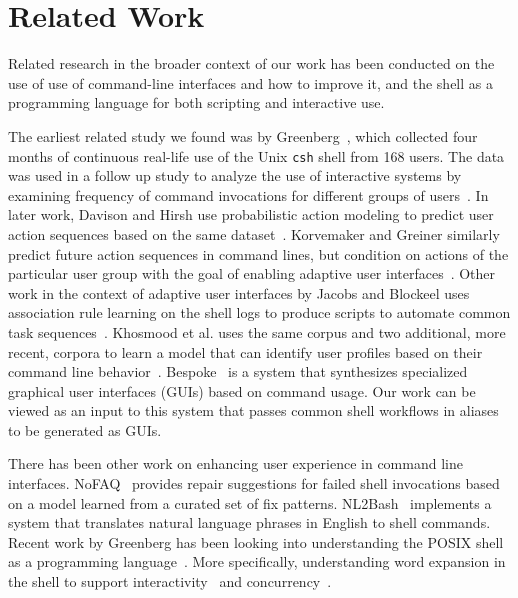 \section{Related Work}

Related research in the broader context of our work has been conducted on the use of use of command-line interfaces and how to improve it, and the shell as a programming language for both scripting and interactive use. 

The earliest related study we found was by Greenberg~\cite{greenberg:88a}, which collected four months of continuous real-life use of the Unix \verb|csh| shell from 168 users. 
The data was used in a follow up study to analyze the use of interactive systems by examining frequency of command invocations for different groups of users~\cite{greenberg:88b}.
In later work, Davison and Hirsh use probabilistic action modeling to predict user action sequences based on the same dataset~\cite{davison:98}.
Korvemaker and Greiner similarly predict future action sequences in command lines, but condition on actions of the particular user group with the goal of enabling adaptive user interfaces~\cite{korvemaker:00}.
Other work in the context of adaptive user interfaces by Jacobs and Blockeel uses association rule learning on the shell logs to produce scripts to automate common task sequences~\cite{jacobs:01}.
Khosmood et al. uses the same corpus and two additional, more recent, corpora to learn a model that can identify user profiles based on their command line behavior~\cite{khosmood:14}.
Bespoke~\cite{bespoke:19} is a system that synthesizes specialized graphical user interfaces (GUIs) based on command usage.
Our work can be viewed as an input to this system that passes common shell workflows in aliases to be generated as GUIs.

There has been other work on enhancing user experience in command line interfaces.
NoFAQ~\cite{dantoni:17} provides repair suggestions for failed shell invocations based on a model learned from a curated set of fix patterns.
NL2Bash~\cite{lin:18} implements a system that translates natural language phrases in English to shell commands.
Recent work by Greenberg has been looking into understanding the POSIX shell as a programming language~\cite{greenberg:17}.
More specifically, understanding word expansion in the shell to support interactivity~\cite{greenberg:18a} and concurrency~\cite{greenberg:18b}.
